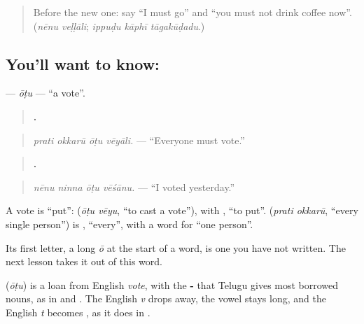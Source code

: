 \label{lesson:TE-C319-otu}



\begin{quote}
Before the new one: say \textquotedblleft{}I must go\textquotedblright{} and \textquotedblleft{}you must not drink coffee now\textquotedblright{}. (\emph{nēnu veḷḷāli}; \emph{ippuḍu kāphī tāgakūḍadu}.)
\end{quote}

\subsection*{You'll want to know: }
\textbf{} — \emph{ōṭu} — \textquotedblleft{}a vote\textquotedblright{}.

\begin{quote}
\textbf{   .}
\end{quote}

\begin{quote}
\emph{prati okkarū ōṭu vēyāli.} — \textquotedblleft{}Everyone must vote.\textquotedblright{}
\end{quote}

\begin{quote}
\textbf{   .}
\end{quote}

\begin{quote}
\emph{nēnu ninna ōṭu vēśānu.} — \textquotedblleft{}I voted yesterday.\textquotedblright{}
\end{quote}

A vote is \textquotedblleft{}put\textquotedblright{}: \textbf{ } (\emph{ōṭu vēyu}, \textquotedblleft{}to cast a vote\textquotedblright{}), with \textbf{}, \textquotedblleft{}to put\textquotedblright{}. \textbf{ } (\emph{prati okkarū}, \textquotedblleft{}every single person\textquotedblright{}) is \textbf{}, \textquotedblleft{}every\textquotedblright{}, with a word for \textquotedblleft{}one person\textquotedblright{}.

Its first letter, a long \emph{ō} at the start of a word, is one you have not written. The next lesson takes it out of this word.

\begin{cousinweb}
\textbf{} (\emph{ōṭu}) is a loan from English \emph{vote}, with the \textbf{-} that Telugu gives most borrowed nouns, as in \textbf{} and \textbf{}. The English \emph{v} drops away, the vowel stays long, and the English \emph{t} becomes \textbf{}, as it does in \textbf{}.
\end{cousinweb}

